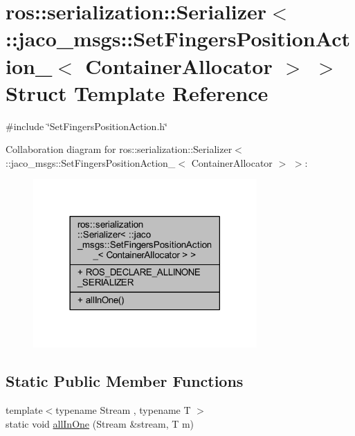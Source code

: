\hypertarget{structros_1_1serialization_1_1Serializer_3_01_1_1jaco__msgs_1_1SetFingersPositionAction___3_01ContainerAllocator_01_4_01_4}{}\section{ros\+:\+:serialization\+:\+:Serializer$<$ \+:\+:jaco\+\_\+msgs\+:\+:Set\+Fingers\+Position\+Action\+\_\+$<$ Container\+Allocator $>$ $>$ Struct Template Reference}
\label{structros_1_1serialization_1_1Serializer_3_01_1_1jaco__msgs_1_1SetFingersPositionAction___3_01ContainerAllocator_01_4_01_4}


{\ttfamily \#include \char`\"{}Set\+Fingers\+Position\+Action.\+h\char`\"{}}



Collaboration diagram for ros\+:\+:serialization\+:\+:Serializer$<$ \+:\+:jaco\+\_\+msgs\+:\+:Set\+Fingers\+Position\+Action\+\_\+$<$ Container\+Allocator $>$ $>$\+:
\nopagebreak
\begin{figure}[H]
\begin{center}
\leavevmode
\includegraphics[width=242pt]{d1/d7c/structros_1_1serialization_1_1Serializer_3_01_1_1jaco__msgs_1_1SetFingersPositionAction___3_01Co1a0c64371a00e48aa70387600f73582b}
\end{center}
\end{figure}
\subsection*{Static Public Member Functions}
\begin{DoxyCompactItemize}
\item 
{\footnotesize template$<$typename Stream , typename T $>$ }\\static void \hyperlink{structros_1_1serialization_1_1Serializer_3_01_1_1jaco__msgs_1_1SetFingersPositionAction___3_01ContainerAllocator_01_4_01_4_ae856b9fe5651ac1601874588a5ebddde}{all\+In\+One} (Stream \&stream, T m)
\end{DoxyCompactItemize}
